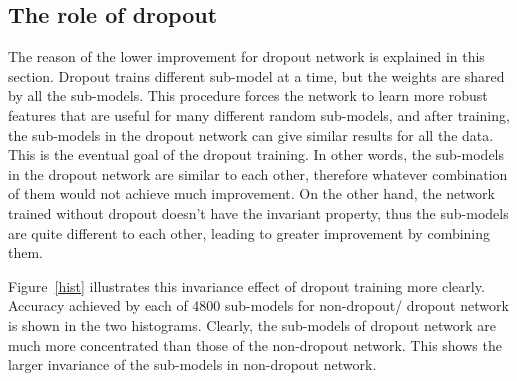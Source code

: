 \documentclass{article} %
\begin{document}
\subsection{The role of dropout}
The reason of the lower improvement for dropout network is explained in this section. Dropout trains different sub-model at a time, but the weights are shared by all the sub-models. This procedure forces the network to learn more robust features that are useful for many different random sub-models, and after training, the sub-models in the dropout network can give similar results for all the data. This is the eventual goal of the dropout training. In other words, the sub-models in the dropout network are similar to each other, therefore whatever combination of them would not achieve much improvement. On the other hand, the network trained without dropout doesn't have the invariant property, thus the sub-models are quite different to each other, leading to greater improvement by combining them.
\par
Figure~\ref{hist} illustrates this invariance effect of dropout training more clearly. Accuracy achieved by each of 4800 sub-models for non-dropout/ dropout network is shown in the two histograms. Clearly, the sub-models of dropout network are much more concentrated than those of the non-dropout network. This shows the larger invariance of the sub-models in non-dropout network.
\end{document}
